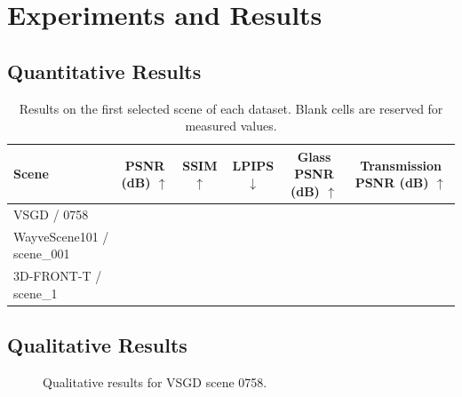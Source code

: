 \chapter{Experiments and Results}
\section{Quantitative Results}

\begin{table}[!htbp]
  \centering
  \caption{Results on the first selected scene of each dataset. Blank cells are reserved for measured values.}
  \label{tab:quantitative-results}
  \small
  \setlength{\tabcolsep}{5pt}
  \renewcommand{\arraystretch}{1.5}
  \begin{tabularx}{\linewidth}{@{}Xccccc@{}}
    \toprule
    Scene & \shortstack{PSNR\\(dB) $\uparrow$}
          & SSIM $\uparrow$ & LPIPS $\downarrow$
          & \shortstack{Glass PSNR\\(dB) $\uparrow$}
          & \shortstack{Transmission\\PSNR (dB) $\uparrow$}\\
    \midrule
    VSGD / 0758 & & & & & \\
    WayveScene101 / scene\_001 & & & & & \\
    3D-FRONT-T / scene\_1 & & & & & \\
    \bottomrule
  \end{tabularx}
\end{table}

\vspace{1.5cm}

\clearpage
\section{Qualitative Results}

\begin{figure}[!htbp]
  \centering
  \caption{Qualitative results for VSGD scene 0758.}
  \label{fig:results-vsgd}
\end{figure}

